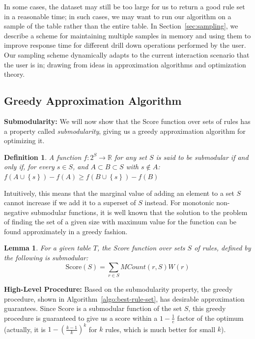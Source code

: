 \documentclass[10pt,journal,compsoc]{IEEEtran}
\newtheorem{lemma}{Lemma}
\newtheorem{definition}{Definition}
\newcounter{prob}
\newcommand{\stitle}[1]{\vspace{0.5em}\noindent\textbf{#1}}
\begin{document}
In some cases, the dataset may still be too large for us to return a good rule set in
a reasonable time; in such cases, we may want to run our algorithm on a sample of the table
rather than the entire table. In Section~\ref{sec:sampling}, we describe a scheme 
for maintaining multiple samples in memory and using them to improve response 
time for different drill down operations performed by the user. Our sampling scheme dynamically adapts to the current interaction scenario that the user is in; drawing from ideas in approximation algorithms and optimization theory.

\subsection{Greedy Approximation Algorithm}\label{sec:greedy-approx}
\stitle{Submodularity:} We will now show that the Score function over sets of rules has a property called {\em submodularity}, giving us a greedy approximation algorithm for optimizing it. 
\begin{definition}
A function $f: 2^S \rightarrow \mathbb{R}$ for any set $S$ is said to be submodular if and only if, for every $s \in S$, and $A \subset B \subset S$ with $s \notin A$: $f(A \cup \left\lbrace s \right\rbrace) - f(A) \geq f(B \cup \left\lbrace s \right\rbrace) - f(B)$
\end{definition}
Intuitively, this means that the marginal value of adding an element to a set $S$ cannot increase if we add it to a superset of $S$ instead. For monotonic non-negative submodular functions, it is well known that the solution to the problem of finding the set of a given size with maximum value for the function can be found approximately in a greedy fashion. 

\begin{lemma}\label{lemma:submodular}
For a given table $T$, the Score function over sets $S$ of rules, defined by the following is submodular:
$$\text{Score}(S) = \sum_{r \in S} MCount(r,S)W(r)$$
\end{lemma}
\vspace{-10pt}

\stitle{High-Level Procedure:} Based on the submodularity property, the greedy procedure,
shown in Algorithm~\ref{algo:best-rule-set}, has desirable approximation guarantees. Since Score is a submodular function of the set $S$, 
this greedy procedure is guaranteed to give us a score within a $1 - \frac{1}{e}$ factor of the optimum (actually, it is $1 - (\frac{k-1}{k})^k$ for $k$ rules, which is much better for small $k$). 
\end{document}
